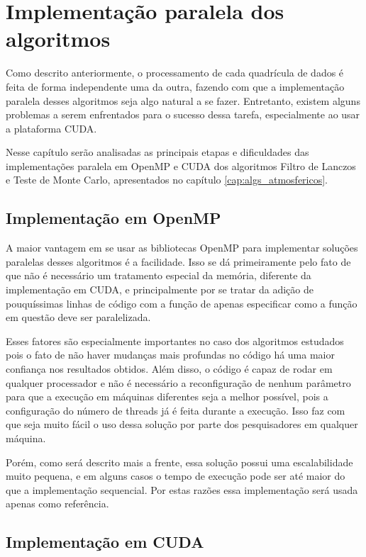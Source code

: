 \chapter{Implementação paralela dos algoritmos}

Como descrito anteriormente, o processamento de cada quadrícula de dados é feita de forma independente uma da outra, fazendo com que a implementação paralela desses algoritmos seja algo natural a se fazer. Entretanto, existem alguns problemas a serem enfrentados para o sucesso dessa tarefa, especialmente ao usar a plataforma CUDA.

Nesse capítulo serão analisadas as principais etapas e dificuldades das implementações paralela em OpenMP \cite{openmp_guide} e CUDA \cite{cuda_guide} dos algoritmos Filtro de Lanczos e Teste de Monte Carlo, apresentados no capítulo \ref{cap:algs_atmosfericos}.

\section{Implementação em OpenMP}

A maior vantagem em se usar as bibliotecas OpenMP \cite{openmp_guide} para implementar soluções paralelas desses algoritmos é a facilidade. Isso se dá primeiramente pelo fato de que não é necessário um tratamento especial da memória, diferente da implementação em CUDA, e principalmente por se tratar da adição de pouquíssimas linhas de código com a função de apenas especificar como a função em questão deve ser paralelizada.

Esses fatores são especialmente importantes no caso dos algoritmos estudados pois o fato de não haver mudanças mais profundas no código há uma maior confiança nos resultados obtidos. Além disso, o código é capaz de rodar em qualquer processador e não é necessário a  reconfiguração de nenhum parâmetro para que a execução em máquinas diferentes seja a melhor possível, pois a configuração do número de threads já é feita durante a execução. Isso faz com que seja muito fácil o uso dessa solução por parte dos pesquisadores em qualquer máquina.

Porém, como será descrito mais a frente, essa solução possui uma escalabilidade muito pequena, e em alguns casos o tempo de execução pode ser até maior do que a implementação sequencial. Por estas razões essa implementação será usada apenas como referência.

\section{Implementação em CUDA}

